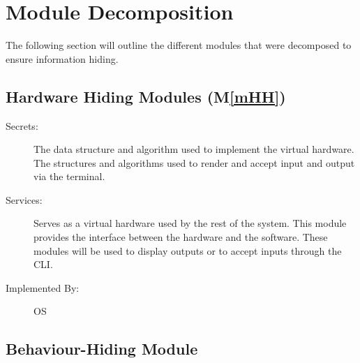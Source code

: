 \documentclass[12pt, titlepage]{article}
\newcommand{\mref}[1]{M\ref{#1}}
\begin{document}
\section{Module Decomposition} \label{SecMD}

The following section will outline the different modules that were decomposed to ensure information hiding.



\subsection{Hardware Hiding Modules (\mref{mHH})}

\begin{description}
\item[Secrets:] The data structure and algorithm used to implement the virtual
  hardware. The structures and algorithms used to render and accept input and output via the terminal.
\item[Services:] Serves as a virtual hardware used by the rest of the
  system. This module provides the interface between the hardware and the
  software. These modules will be used to display outputs or to accept inputs through the CLI.
\item[Implemented By:] OS
\end{description}

\subsection{Behaviour-Hiding Module}
\end{document}
